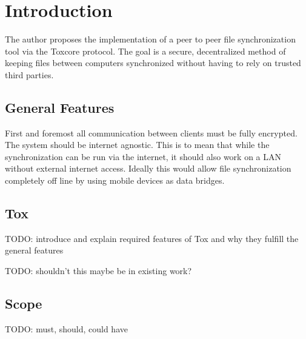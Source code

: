 \chapter{Introduction}

The author proposes the implementation of a peer to peer file synchronization tool via the Toxcore protocol.
The goal is a secure, decentralized method of keeping files between computers synchronized without having to rely on trusted third parties.

\section{General Features}

First and foremost all communication between clients must be fully encrypted.
The system should be internet agnostic.
This is to mean that while the synchronization can be run via the internet, it should also work on a LAN without external internet access.
Ideally this would allow file synchronization completely off line by using mobile devices as data bridges.

\section{Tox}

TODO: introduce and explain required features of Tox and why they fulfill the general features

TODO: shouldn't this maybe be in existing work?

\section{Scope}

TODO: must, should, could have
